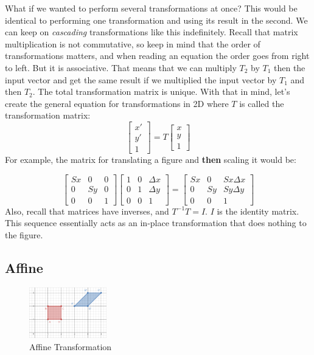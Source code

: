 \documentclass{article}
\begin{document}
What if we wanted to perform several transformations at once? This would be identical to performing one transformation and using its result in the second. We can keep on \textit{cascading} transformations like this indefinitely. Recall that matrix multiplication is not commutative, so keep in mind that the order of transformations matters, and when reading an equation the order goes from right to left. But it is associative. That means that we can multiply $T_2$ by $T_1$ then the input vector and get the same result if we multiplied the input vector by $T_1$ and then $T_2$. The total transformation matrix is unique. With that in mind, let's create the general equation for transformations in 2D where $T$ is called the transformation matrix:
\[
\begin{bmatrix}
x' \\
y' \\
1
\end{bmatrix}
=
T
\begin{bmatrix}
x \\
y \\
1
\end{bmatrix}
\]
\noident
For example, the matrix for translating a figure and \textbf{then} scaling it would be:

\[
\begin{bmatrix}
Sx & 0 & 0 \\
0 & Sy & 0 \\
0 & 0 & 1
\end{bmatrix}
\begin{bmatrix}
1 & 0 & \Delta x \\
0 & 1 & \Delta y \\
0 & 0 & 1
\end{bmatrix}
=
\begin{bmatrix}
Sx & 0 & Sx\Delta x \\
0 & Sy & Sy\Delta y \\
0 & 0 & 1
\end{bmatrix}
\]
\noindent
Also, recall that matrices have inverses, and $T^{-1}T = I$. $I$ is the identity matrix. This sequence essentially acts as an in-place transformation that does nothing to the figure. 

\subsection{Affine}
\begin{figure}
  \begin{center}
    \vspace{-50pt}
    \includegraphics[width=0.30\textwidth]{2d_affine.png}
    \vspace{-20pt}
  \end{center}
  \caption{Affine Transformation}
\end{figure}
\end{document}
